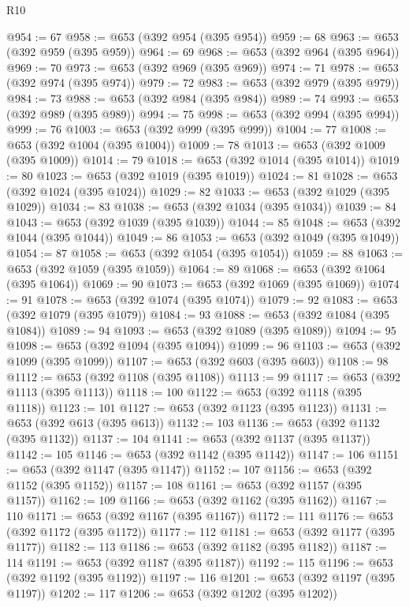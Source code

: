 \begin{lexlean}{R10}
\begin{coremodule}
@954 := 67
@958 := @653 (@392 @954 (@395 @954))
@959 := 68
@963 := @653 (@392 @959 (@395 @959))
@964 := 69
@968 := @653 (@392 @964 (@395 @964))
@969 := 70
@973 := @653 (@392 @969 (@395 @969))
@974 := 71
@978 := @653 (@392 @974 (@395 @974))
@979 := 72
@983 := @653 (@392 @979 (@395 @979))
@984 := 73
@988 := @653 (@392 @984 (@395 @984))
@989 := 74
@993 := @653 (@392 @989 (@395 @989))
@994 := 75
@998 := @653 (@392 @994 (@395 @994))
@999 := 76
@1003 := @653 (@392 @999 (@395 @999))
@1004 := 77
@1008 := @653 (@392 @1004 (@395 @1004))
@1009 := 78
@1013 := @653 (@392 @1009 (@395 @1009))
@1014 := 79
@1018 := @653 (@392 @1014 (@395 @1014))
@1019 := 80
@1023 := @653 (@392 @1019 (@395 @1019))
@1024 := 81
@1028 := @653 (@392 @1024 (@395 @1024))
@1029 := 82
@1033 := @653 (@392 @1029 (@395 @1029))
@1034 := 83
@1038 := @653 (@392 @1034 (@395 @1034))
@1039 := 84
@1043 := @653 (@392 @1039 (@395 @1039))
@1044 := 85
@1048 := @653 (@392 @1044 (@395 @1044))
@1049 := 86
@1053 := @653 (@392 @1049 (@395 @1049))
@1054 := 87
@1058 := @653 (@392 @1054 (@395 @1054))
@1059 := 88
@1063 := @653 (@392 @1059 (@395 @1059))
@1064 := 89
@1068 := @653 (@392 @1064 (@395 @1064))
@1069 := 90
@1073 := @653 (@392 @1069 (@395 @1069))
@1074 := 91
@1078 := @653 (@392 @1074 (@395 @1074))
@1079 := 92
@1083 := @653 (@392 @1079 (@395 @1079))
@1084 := 93
@1088 := @653 (@392 @1084 (@395 @1084))
@1089 := 94
@1093 := @653 (@392 @1089 (@395 @1089))
@1094 := 95
@1098 := @653 (@392 @1094 (@395 @1094))
@1099 := 96
@1103 := @653 (@392 @1099 (@395 @1099))
@1107 := @653 (@392 @603 (@395 @603))
@1108 := 98
@1112 := @653 (@392 @1108 (@395 @1108))
@1113 := 99
@1117 := @653 (@392 @1113 (@395 @1113))
@1118 := 100
@1122 := @653 (@392 @1118 (@395 @1118))
@1123 := 101
@1127 := @653 (@392 @1123 (@395 @1123))
@1131 := @653 (@392 @613 (@395 @613))
@1132 := 103
@1136 := @653 (@392 @1132 (@395 @1132))
@1137 := 104
@1141 := @653 (@392 @1137 (@395 @1137))
@1142 := 105
@1146 := @653 (@392 @1142 (@395 @1142))
@1147 := 106
@1151 := @653 (@392 @1147 (@395 @1147))
@1152 := 107
@1156 := @653 (@392 @1152 (@395 @1152))
@1157 := 108
@1161 := @653 (@392 @1157 (@395 @1157))
@1162 := 109
@1166 := @653 (@392 @1162 (@395 @1162))
@1167 := 110
@1171 := @653 (@392 @1167 (@395 @1167))
@1172 := 111
@1176 := @653 (@392 @1172 (@395 @1172))
@1177 := 112
@1181 := @653 (@392 @1177 (@395 @1177))
@1182 := 113
@1186 := @653 (@392 @1182 (@395 @1182))
@1187 := 114
@1191 := @653 (@392 @1187 (@395 @1187))
@1192 := 115
@1196 := @653 (@392 @1192 (@395 @1192))
@1197 := 116
@1201 := @653 (@392 @1197 (@395 @1197))
@1202 := 117
@1206 := @653 (@392 @1202 (@395 @1202))

\end{coremodule}
\end{lexlean}
